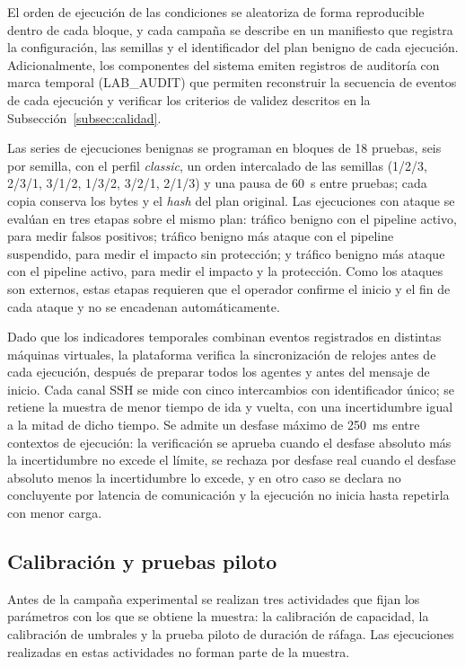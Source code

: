 El orden de ejecución de las condiciones se aleatoriza de forma reproducible dentro de cada bloque, y cada campaña se describe en un manifiesto que registra la configuración, las semillas y el identificador del plan benigno de cada ejecución. Adicionalmente, los componentes del sistema emiten registros de auditoría con marca temporal (LAB\_AUDIT) que permiten reconstruir la secuencia de eventos de cada ejecución y verificar los criterios de validez descritos en la Subsección~\ref{subsec:calidad}.

Las series de ejecuciones benignas se programan en bloques de 18 pruebas, seis por semilla, con el perfil \textit{classic}, un orden intercalado de las semillas (1/2/3, 2/3/1, 3/1/2, 1/3/2, 3/2/1, 2/1/3) y una pausa de 60~s entre pruebas; cada copia conserva los bytes y el \textit{hash} del plan original. Las ejecuciones con ataque se evalúan en tres etapas sobre el mismo plan: tráfico benigno con el pipeline activo, para medir falsos positivos; tráfico benigno más ataque con el pipeline suspendido, para medir el impacto sin protección; y tráfico benigno más ataque con el pipeline activo, para medir el impacto y la protección. Como los ataques son externos, estas etapas requieren que el operador confirme el inicio y el fin de cada ataque y no se encadenan automáticamente.

Dado que los indicadores temporales combinan eventos registrados en distintas máquinas virtuales, la plataforma verifica la sincronización de relojes antes de cada ejecución, después de preparar todos los agentes y antes del mensaje de inicio. Cada canal SSH se mide con cinco intercambios con identificador único; se retiene la muestra de menor tiempo de ida y vuelta, con una incertidumbre igual a la mitad de dicho tiempo. Se admite un desfase máximo de 250~ms entre contextos de ejecución: la verificación se aprueba cuando el desfase absoluto más la incertidumbre no excede el límite, se rechaza por desfase real cuando el desfase absoluto menos la incertidumbre lo excede, y en otro caso se declara no concluyente por latencia de comunicación y la ejecución no inicia hasta repetirla con menor carga.

\subsection{Calibración y pruebas piloto}
\label{subsec:calibracion}

Antes de la campaña experimental se realizan tres actividades que fijan los parámetros con los que se obtiene la muestra: la calibración de capacidad, la calibración de umbrales y la prueba piloto de duración de ráfaga. Las ejecuciones realizadas en estas actividades no forman parte de la muestra.

